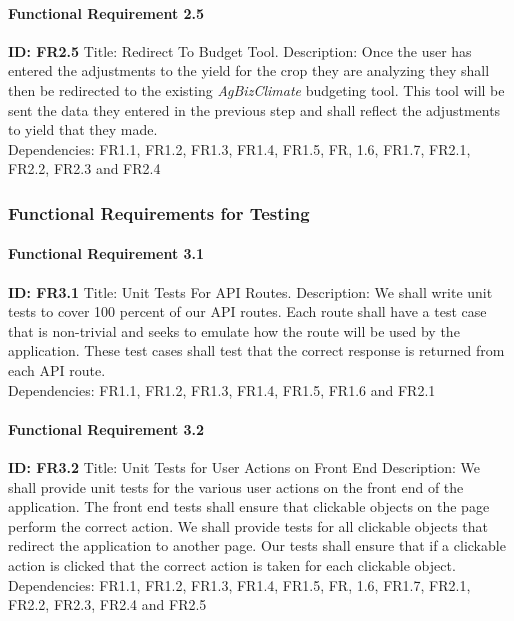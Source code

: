 \documentclass[onecolumn, draftclsnofoot,10pt, compsoc]{article}
\begin{document}
				\paragraph{Functional Requirement 2.5}
					\textbf{ID: FR2.5}\hfill \break
					Title: Redirect To Budget Tool.\hfill \break
					Description: Once the user has entered the adjustments to the yield for the crop they are analyzing they shall then be redirected to the existing \textit{AgBizClimate} budgeting tool. This tool will be sent the data they entered in the previous step and shall reflect the adjustments to yield that they made.\\
					Dependencies: FR1.1, FR1.2, FR1.3, FR1.4, FR1.5, FR, 1.6, FR1.7, FR2.1, FR2.2, FR2.3 and FR2.4\hfill \break
			\subsubsection{Functional Requirements for Testing}
				\paragraph{Functional Requirement 3.1}
				\textbf{ID: FR3.1}\hfill \break
				Title: Unit Tests For API Routes.\hfill \break
				Description: We shall write unit tests to cover 100 percent of our API routes. Each route shall have a test case that is non-trivial and seeks to emulate how the route will be used by the application. These test cases shall test that the correct response is returned from each API route.\\
				Dependencies: FR1.1, FR1.2, FR1.3, FR1.4, FR1.5, FR1.6 and FR2.1\hfill \break
				\paragraph{Functional Requirement 3.2}
				\textbf{ID: FR3.2}\hfill \break
				Title: Unit Tests for User Actions on Front End \hfill \break
				Description: We shall provide unit tests for the various user actions on the front end of the application. The front end tests shall ensure that clickable objects on the page perform the correct action. We shall provide tests for all clickable objects that redirect the application to another page. Our tests shall ensure that if a clickable action is clicked that the correct action is taken for each clickable object.\\
				Dependencies:  FR1.1, FR1.2, FR1.3, FR1.4, FR1.5, FR, 1.6, FR1.7, FR2.1, FR2.2, FR2.3, FR2.4 and FR2.5\hfill \break
\end{document}
